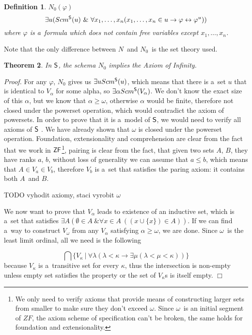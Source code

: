 \documentclass[12pt,a4paper]{article}
\newtheorem{theorem}{Theorem}[section]
\newtheorem{definition}[theorem]{Definition}
\newenvironment{proof}
{\noindent \textit{Proof.}}
{\hspace*{\fill} $\Box$}
\renewcommand{\iff}{\leftrightarrow}
\newcommand{\then}{\rightarrow}
\begin{document}
\begin{definition}{$N_0(\varphi)$}
\begin{equation}
\exists u (Scm^{\sf{S}}(u)\ \&\ \forall x_1, \ldots , x_n (x_1, \ldots , x_n \in u \then \varphi \iff \varphi^{u}))
\end{equation}
where $\varphi$ is a~formula which does not contain free variables except $x_1, \ldots , x_n$.
\end{definition}

Note that the only difference between $N$ and $N_0$ is the set theory used.

\begin{theorem}
In $\sf{S}$, the schema $N_0$ implies the Axiom of Infinity.
\end{theorem}

\begin{proof}
For any $\varphi$, $N_0$ gives us $\exists u Scm^{\sf{S}}(u)$, which means that there is a~set $u$ that is identical to $V_\alpha$ for some alpha, so $\exists \alpha Scm^{\sf{S}}(V_\alpha)$.
We don't know the exact size of this $\alpha$, but we know that $\alpha \geq \omega$, otherwise $\alpha$ would be finite, therefore not closed under the powerset operation, which would contradict the axiom of powersets. 
In order to prove that it is a~model of $\sf{S}$, we would need to verify all axioms of $\sf{S}$ . We have already shown that $\omega$ is closed under the powerset operation. Foundation, extensionality and comprehension are clear from the fact that we work in $\sf{ZF}$\footnote{We only need to verify axioms that provide means of constructing larger sets from smaller to make sure they don't exceed $\omega$. Since $\omega$ is an initial segment of $ZF$, the axiom scheme of specification can't be broken, the same holds for foundation and extensionality.}, pairing is clear from the fact, that given two sets $A$, $B$, they have ranks $a$, $b$, without loss of generality we can assume that $a \leq b$, which means that $A \in V_a \in V_b$, therefore $V_b$ is a~set that satisfies the paring axiom: it contains both $A$ and $B$.

TODO vyhodit axiomy, staci vyrobit $\omega$

We now want to prove that $V_\alpha$ leads to existence of an inductive set, which is a~set that satisfies $\exists A(\emptyset \in A~\& \forall  x \in A~((x \cup \{ x\}) \in A))$. If we can find a~way to construct $V_\omega$ from any $V_\alpha$ satisfying $\alpha \geq \omega$, we are done. Since $\omega$ is the least limit ordinal, all we need is the following

\begin{equation}
\bigcap \{V_\kappa\ |\  \forall \lambda(\lambda < \kappa \then \exists \mu(\lambda < \mu < \kappa))\}
\end{equation}
because $V_\kappa$ is a~transitive set for every $\kappa$, thus the intersection is non-empty unless empty set satisfies the property or the set of $V_\kappa$s is itself empty.
\end{proof}
\end{document}
